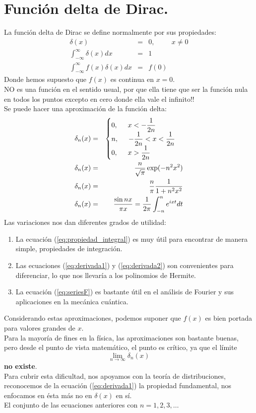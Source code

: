 \section{Función delta de Dirac.}
La función delta de Dirac se define normalmente por sus propiedades:
\begin{eqnarray}
\delta(x) &=& 0, \hspace{1cm} x \neq 0 \\
\int_{-\infty}^{\infty} \delta (x) dx  &=& 1 \\
\int_{-\infty}^{\infty} f(x) \delta (x) dx &=& f(0) \label{eq:derivada1}
\end{eqnarray}
Donde hemos supuesto que $f(x)$ es continua en $x=0$.
\\
NO es una función en el sentido usual, por que ella tiene que ser la función nula en todos los puntos excepto en cero donde ella vale el infinito!!
\\
Se puede hacer una aproximación de la función delta:
\begin{eqnarray}
\delta_{n} (x) &=& \begin{cases}
0, \hspace{0.5cm} x < - \dfrac{1}{2n} \\
n, \hspace{0.5cm} - \dfrac{1}{2n} < x < \dfrac{1}{2n} \\
0, \hspace{0.5cm} x > \dfrac{1}{2n}
\end{cases} \label{eq:propiedad_integral} \\
\delta_{n} (x) &=& \dfrac{n}{\sqrt{\pi}} \exp(-n^{2} x^{2}) \label{eq:derivada2} \\
\delta_{n} (x) &=& \dfrac{n}{\pi} \dfrac{1}{1 + n^{2} x^{2}} \\
\delta_{n} (x) &=& \dfrac{\sin nx}{\pi x} = \dfrac{1}{2 \pi} \int_{-n}^{n} e^{ixt} dt \label{eq:seriesF}
\end{eqnarray}
Las variaciones nos dan diferentes grados de utilidad:
\begin{enumerate}
\item La ecuación (\ref{eq:propiedad_integral}) es muy útil para encontrar de manera simple, propiedades de integración.
\item Las ecuaciones (\ref{eq:derivada1}) y (\ref{eq:derivada2}) son convenientes para diferenciar, lo que nos llevaría a los polinomios de Hermite.
\item La ecuación (\ref{eq:seriesF}) es bastante útil en el análisis de Fourier y sus aplicaciones en la mecánica cuántica.
\end{enumerate}
Considerando estas aproximaciones, podemos suponer que $f(x)$ es bien portada para valores grandes de $x$.
\\
Para la mayoría de fines en la física, las aproximaciones son bastante buenas, pero desde el punto de vista matemático, el punto es crítico, ya que el límite
\[ \lim_{n \to \infty} \delta_{n} (x) \]
\textbf{no existe}.
\\
Para cubrir esta dificultad, nos apoyamos con la teoría de distribuciones, reconocemos de la ecuación (\ref{eq:derivada1}) la propiedad fundamental, nos enfocamos en ésta más no en $\delta(x)$ en sí.
\\
El conjunto de las ecuaciones anteriores con $n=1,2,3,\ldots$
